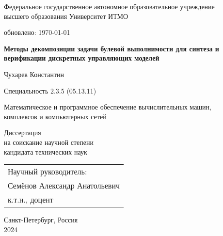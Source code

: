\thispagestyle{empty}

\begin{center}
	Федеральное государственное автономное образовательное учреждение \\
	высшего образования Университет ИТМО

	{\tiny обновлено: \today}
\end{center}

\vspace{0pt plus2fill}

\begin{center}
\textbf{\large %
Методы декомпозиции задачи булевой выполнимости для синтеза и верификации дискретных управляющих моделей
}

\vspace{1.5cm}

{\large
Чухарев Константин
}

\vspace{1cm}

{Специальность 2.3.5 (05.13.11)}

{\small
Математическое и программное обеспечение вычислительных машин, \\
комплексов и компьютерных сетей}

Диссертация \\
на соискание научной степени \\
кандидата технических наук
\end{center}

\vspace{0pt plus1fill}

\hfill\begin{tabular}{l}
Научный руководитель: \\
Семёнов Александр Анатольевич \\
к.т.н., доцент
\end{tabular}

\vspace{0pt plus1fill}

\begin{center}
	Санкт-Петербург, Россия \\
	2024
\end{center}
